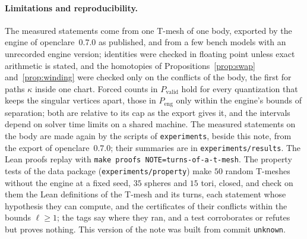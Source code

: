 \documentclass[11pt,a4paper]{article}
\providecommand{\enginecommit}{unknown}
\begin{document}
\paragraph{Limitations and reproducibility.}
The measured statements come from one T-mesh of one body, exported by the
engine of openclare~0.7.0 as published, and from a few bench models with an
unrecorded engine version; identities were checked in
floating point unless exact arithmetic is stated, and the homotopies of
Propositions~\ref{prop:swap} and~\ref{prop:winding} were checked only on the
conflicts of the body, the first for paths $\kappa$ inside one chart. Forced
counts in $P_{\mathrm{valid}}$ hold for every quantization that keeps the
singular vertices apart, those in $P_{\mathrm{eng}}$ only within the engine's
bounds of separation; both are relative to its cap as the export gives it, and
the intervals depend on solver time limits on a shared machine. The measured statements on the body are made again by the
scripts of \texttt{experiments}, beside this note, from the export of
openclare~0.7.0; their summaries are in \texttt{experiments/results}. The Lean proofs
replay with \texttt{make proofs NOTE=turns-of-a-t-mesh}. The property tests of the
data package (\texttt{experiments/property}) make $50$ random T-meshes
without the engine at a fixed seed, $35$ spheres and $15$ tori, closed, and
check on them the Lean definitions of the T-mesh and its turns, each
statement whose hypothesis they can compute, and the certificates of their
conflicts within the bounds $\ell \ge 1$; the tags say where they ran, and
a test corroborates or refutes but proves nothing. This version of the
note was built from commit \texttt{\enginecommit}.
\end{document}
